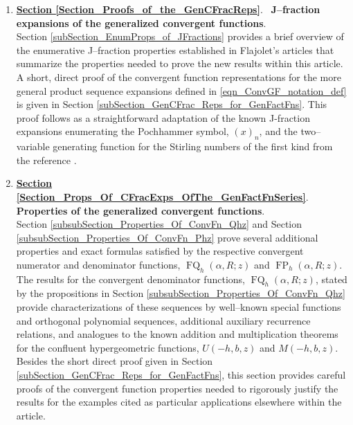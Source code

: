 \documentclass[12pt,reqno]{article}
\numberwithin{sfootnote}{section}
\numberwithin{equation}{section}
\renewcommand{\labelenumi}{\textbf{\arabic{enumi}.}}
\newcommand{\itemlabel}[1]{\textbf{#1}: \\ }
\renewcommand{\labelenumi}{$\mathsmaller{\blacktriangleright}$ }
\theoremstyle{DefaultTheoremStyle}
\theoremstyle{definition}
\newcommand{\Pochhammer}[2]{\ensuremath{\left(#1\right)_{#2}}}
\newcommand{\HypU}[3]{\ensuremath{U\left(#1, #2, #3\right)}}
\newcommand{\HypM}[3]{\ensuremath{M\left(#1, #2, #3\right)}}
\newcommand{\ConvFP}[4]{\ensuremath{\FP_{#1}\left(#2, #3; #4\right)}}
\newcommand{\ConvFQ}[4]{\ensuremath{\FQ_{#1}\left(#2, #3; #4\right)}}
\DeclareMathOperator{\FP}{FP}
\DeclareMathOperator{\FQ}{FQ}
\begin{document}
\newcommand{\sectionpageref}[1]{
     \smaller{\textbf{\textit{(Page \pageref{#1})}}}
} 
\begin{enumerate}[leftmargin=\parindent,itemsep=-1mm]  
     \renewcommand{\labelenumi}{$\mathsmaller\blacktriangleright$ } 
     \renewcommand{\labelenumii}{$\mathsmaller\vartriangleright$ } 

     \renewcommand{\itemlabel}[3][Section]{ 
          \item {\normalsize \textbf{\underline{#1 \ref{#2}}}.\ 
          \textrm{\textbf{#3}}.\ \sectionpageref{#2}} 
     } 

\itemlabel{Section_Proofs_of_the_GenCFracReps}{
           J--fraction expansions of the 
           generalized convergent functions} \\ 
Section \ref{subSection_EnumProps_of_JFractions} 
provides a brief overview of the enumerative 
J--fraction properties 
established in Flajolet's articles that summarize the properties 
needed to prove the new results within this article. 
A short, direct proof of the convergent function representations for the 
more general product sequence expansions defined in 
\eqref{eqn_ConvGF_notation_def} is given in 
Section \ref{subSection_GenCFrac_Reps_for_GenFactFns}. 
This proof follows as a straightforward adaptation of the known 
J-fraction expansions enumerating the Pochhammer symbol, 
$\Pochhammer{x}{n}$, and the two--variable generating function for the 
Stirling numbers of the first kind from the reference 
\citep{FLAJOLET80B}. \\ 

\itemlabel{Section_Props_Of_CFracExps_OfThe_GenFactFnSeries}{
           Properties of the generalized convergent functions} \\ 
Section \ref{subsubSection_Properties_Of_ConvFn_Qhz} and 
Section \ref{subsubSection_Properties_Of_ConvFn_Phz} 
prove several additional properties and exact formulas satisfied by the 
respective convergent numerator and denominator functions, 
$\ConvFQ{h}{\alpha}{R}{z}$ and $\ConvFP{h}{\alpha}{R}{z}$. 
The results for the convergent denominator functions, 
$\ConvFQ{h}{\alpha}{R}{z}$, 
stated by the propositions in 
Section \ref{subsubSection_Properties_Of_ConvFn_Qhz} 
provide characterizations of these sequences by well--known special 
functions and orthogonal polynomial sequences, 
additional auxiliary recurrence relations, and analogues to the known 
addition and multiplication theorems for the 
confluent hypergeometric functions, 
$\HypU{-h}{b}{z}$ and $\HypM{-h}{b}{z}$. 
Besides the short direct proof given in 
Section \ref{subSection_GenCFrac_Reps_for_GenFactFns}, 
this section provides careful proofs of the convergent function 
properties needed to rigorously justify the results for the examples 
cited as particular applications elsewhere within the article. 


\end{enumerate}
\end{document}
